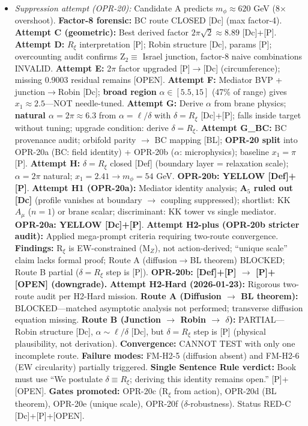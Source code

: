 \begin{tcolorbox}[breakable, enhanced, colback=blue!5, colframe=blue!60!black,
    title=\textbf{OPR Closure Plan: Prioritized Research Program}, width=\linewidth]
\begin{itemize}[nosep]
    \item \emph{Suppression attempt (OPR-20):} Candidate A predicts $m_\phi \approx 620$ GeV (8$\times$ overshoot). \textbf{Factor-8 forensic:} BC route CLOSED [Dc] (max factor-4). \textbf{Attempt C (geometric):} Best derived factor $2\pi\sqrt{2} \approx 8.89$ [Dc]+[P]. \textbf{Attempt D:} $R_\xi$ interpretation [P]; Robin structure [Dc], params [P]; overcounting audit confirms Z$_2 \equiv$ Israel junction, factor-8 naive combinations INVALID. \textbf{Attempt E:} 2$\pi$ factor upgraded [P]$\to$[Dc] (circumference); missing 0.9003 residual remains [OPEN]. \textbf{Attempt F:} Mediator BVP + junction$\to$Robin [Dc]; \textbf{broad region} $\alpha \in [5.5, 15]$ (47\% of range) gives $x_1 \approx 2.5$---NOT needle-tuned. \textbf{Attempt G:} Derive $\alpha$ from brane physics; \textbf{natural $\alpha = 2\pi \approx 6.3$} from $\alpha = \ell/\delta$ with $\delta = R_\xi$ [Dc]+[P]; falls inside target without tuning; upgrade condition: derive $\delta = R_\xi$. \textbf{Attempt G\_BC:} BC provenance audit; orbifold parity $\to$ BC mapping [BL]; \textbf{OPR-20 split} into OPR-20a (BC: field identity) + OPR-20b ($\alpha$: microphysics); baseline $x_1 = \pi$ [P]. \textbf{Attempt H:} $\delta = R_\xi$ closed [Def] (boundary layer = relaxation scale); $\alpha = 2\pi$ natural; $x_1 = 2.41 \to m_\phi = 54$ GeV. \textbf{OPR-20b: YELLOW [Def]+[P]}. \textbf{Attempt H1 (OPR-20a):} Mediator identity analysis; \textbf{A$_5$ ruled out [Dc]} (profile vanishes at boundary $\to$ coupling suppressed); shortlist: KK $A_\mu$ ($n=1$) or brane scalar; discriminant: KK tower vs single mediator. \textbf{OPR-20a: YELLOW [Dc]+[P]}. \textbf{Attempt H2-plus (OPR-20b stricter audit):} Applied mega-prompt criteria requiring two-route convergence. \textbf{Findings:} R$_\xi$ is EW-constrained (M$_Z$), not action-derived; ``unique scale'' claim lacks formal proof; Route A (diffusion$\to$BL theorem) BLOCKED; Route B partial ($\delta = R_\xi$ step is [P]). \textbf{OPR-20b: [Def]+[P] $\to$ [P]+[OPEN] (downgrade).} \textbf{Attempt H2-Hard (2026-01-23):} Rigorous two-route audit per H2-Hard mission. \textbf{Route A (Diffusion $\to$ BL theorem):} BLOCKED---matched asymptotic analysis not performed; transverse diffusion equation missing. \textbf{Route B (Junction $\to$ Robin $\to$ $\delta$):} PARTIAL---Robin structure [Dc], $\alpha \sim \ell/\delta$ [Dc], but $\delta = R_\xi$ step is [P] (physical plausibility, not derivation). \textbf{Convergence:} CANNOT TEST with only one incomplete route. \textbf{Failure modes:} FM-H2-5 (diffusion absent) and FM-H2-6 (EW circularity) partially triggered. \textbf{Single Sentence Rule verdict:} Book must use ``We postulate $\delta \equiv R_\xi$; deriving this identity remains open.'' [P]+[OPEN]. \textbf{Gates promoted:} OPR-20c (R$_\xi$ from action), OPR-20d (BL theorem), OPR-20e (unique scale), OPR-20f ($\delta$-robustness). Status RED-C [Dc]+[P]+[OPEN].

\end{itemize}
\end{tcolorbox}
